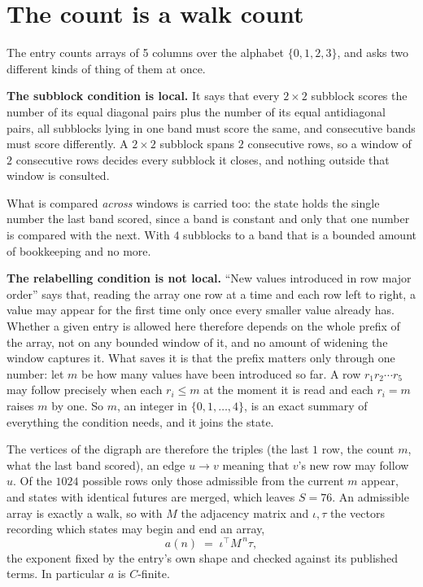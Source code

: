 \documentclass[11pt,a4paper]{article}
\theoremstyle{plain}
\theoremstyle{definition}
\begin{document}
\section{The count is a walk count}

The entry counts arrays of 5 columns over the alphabet $\{0,1,2,3\}$, and asks two different kinds of thing of them at once.

\textbf{The subblock condition is local.} It says that every $2\times2$ subblock scores the number of its equal diagonal pairs plus the number of its equal antidiagonal pairs, all subblocks lying in one band must score the same, and consecutive bands must score differently. A $ 2\times2$ subblock spans $2$ consecutive rows, so a window of $2$ consecutive rows decides every subblock it closes, and nothing outside that window is consulted.

What is compared \emph{across} windows is carried too: the state holds the single number the last band scored, since a band is constant and only that one number is compared with the next. With $4$ subblocks to a band that is a bounded amount of bookkeeping and no more.

\textbf{The relabelling condition is not local.} ``New values introduced in row major order'' says that, reading the array one row at a time and each row left to right, a value may appear for the first time only once every smaller value already has. Whether a given entry is allowed here therefore depends on the whole prefix of the array, not on any bounded window of it, and no amount of widening the window captures it. What saves it is that the prefix matters only through one number: let $m$ be how many values have been introduced so far. A row $r_1r_2\cdots r_5$ may follow precisely when each $r_i\le m$ at the moment it is read and each $r_i=m$ raises $m$ by one. So $m$, an integer in $\{0,1,\dots,4\}$, is an exact summary of everything the condition needs, and it joins the state.

The vertices of the digraph are therefore the triples (the last $1$ row, the count $m$, what the last band scored), an edge $u\to v$ meaning that $v$'s new row may follow $u$. Of the $1024$ possible rows only those admissible from the current $m$ appear, and states with identical futures are merged, which leaves $S=76$. An admissible array is exactly a walk, so with $M$ the adjacency matrix and $\iota,\tau$ the vectors recording which states may begin and end an array,
\[
a(n)\;=\;\iota^{\!\top}M^{\,n}\tau ,
\]
the exponent fixed by the entry's own shape and checked against its published terms. In
particular $a$ is $C$-finite.
\end{document}
